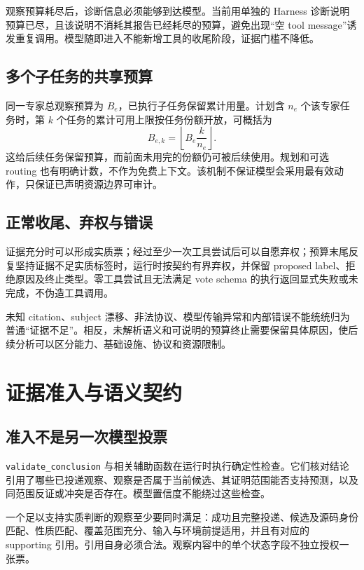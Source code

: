 \documentclass[UTF8,a4paper,zihao=-4,fontset=none]{ctexart}
\newcommand{\code}[1]{{\small\nolinkurl{#1}}}
\begin{document}
观察预算耗尽后，诊断信息必须能够到达模型。当前用单独的 Harness 诊断说明预算已尽，且该说明不消耗其报告已经耗尽的预算，避免出现“空 tool message”诱发重复调用。模型随即进入不能新增工具的收尾阶段，证据门槛不降低。

\subsection{多个子任务的共享预算}
同一专家总观察预算为 $B_e$，已执行子任务保留累计用量。计划含 $n_e$ 个该专家任务时，第 $k$ 个任务的累计可用上限按任务份额开放，可概括为
\begin{equation}
 B_{e,k}=\left\lfloor B_e\frac{k}{n_e}\right\rfloor.
\end{equation}
这给后续任务保留预算，而前面未用完的份额仍可被后续使用。规划和可选 routing 也有明确计数，不作为免费上下文。该机制不保证模型会采用最有效动作，只保证已声明资源边界可审计。

\subsection{正常收尾、弃权与错误}
证据充分时可以形成实质票；经过至少一次工具尝试后可以自愿弃权；预算末尾反复坚持证据不足实质标签时，运行时按契约有界弃权，并保留 proposed label、拒绝原因及终止类型。零工具尝试且无法满足 vote schema 的执行返回显式失败或未完成，不伪造工具调用。

未知 citation、subject 漂移、非法协议、模型传输异常和内部错误不能统统归为普通“证据不足”。相反，未解析语义和可说明的预算终止需要保留具体原因，使后续分析可以区分能力、基础设施、协议和资源限制。

\section{证据准入与语义契约}
\subsection{准入不是另一次模型投票}
\code{validate_conclusion} 与相关辅助函数在运行时执行确定性检查。它们核对结论引用了哪些已投递观察、观察是否属于当前候选、其证明范围能否支持预测，以及同范围反证或冲突是否存在。模型置信度不能绕过这些检查。

一个足以支持实质判断的观察至少要同时满足：成功且完整投递、候选及源码身份匹配、性质匹配、覆盖范围充分、输入与环境前提适用，并且有对应的 supporting 引用。引用自身必须合法。观察内容中的单个状态字段不独立授权一张票。
\end{document}
